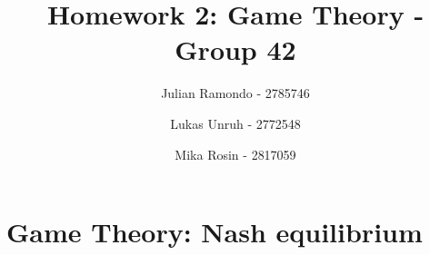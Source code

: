 \documentclass[11pt]{article}
\title{Homework 2: Game Theory - Group 42}
\author{Julian Ramondo - 2785746 \and Lukas Unruh - 2772548 \and Mika Rosin - 2817059}
\begin{document}
    \maketitle

    \setcounter{section}{1}
    \section{Game Theory: Nash equilibrium}

    
    
    
    
\end{document}
